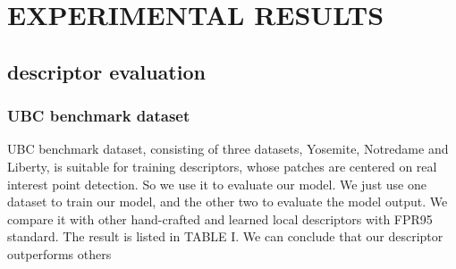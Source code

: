 \documentclass{svproc}
\begin{document}
\section{EXPERIMENTAL RESULTS}


\subsection{descriptor evaluation}

\subsubsection{UBC benchmark dataset}
UBC benchmark dataset\cite{c29}, consisting of three datasets, Yosemite, Notredame and Liberty, is suitable for training descriptors, whose patches are centered on real interest point detection. So we use it to evaluate our model. We just use one dataset to train our model, and the other two to evaluate the model output. We compare it with other hand-crafted and learned local descriptors with FPR95 standard. The result is listed in TABLE I. We can conclude that our descriptor outperforms others
\end{document}
